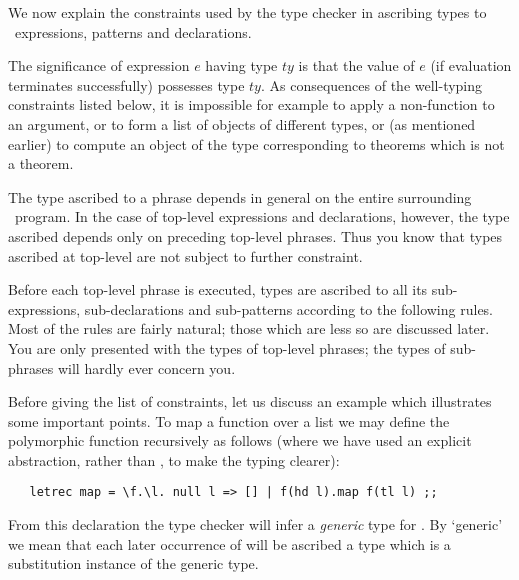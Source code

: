 \documentclass[11pt]{article}
\begin{document}

We now explain the constraints used by the type checker in ascribing types to
\ML\ expressions, patterns and declarations.

The significance of expression $e$ having type $ty$ is that the value of $e$ (if evaluation terminates successfully)
possesses type $ty$.   As consequences of the well-typing constraints listed below,
it is impossible for example to apply a non-function to an argument, or to form
a list of objects of different types, or (as mentioned earlier) to compute an
object of the type corresponding to theorems which is not a theorem.

The type  ascribed to a phrase depends in
general on the entire surrounding \ML\ program.  In the case of
top-level
expressions and declarations, however, the type ascribed depends only on
preceding top-level phrases.  Thus you know that types ascribed at top-level are
not subject to further constraint.

Before each top-level phrase is executed, types are ascribed to all its
sub-expressions, sub-declarations and sub-patterns according to the following
rules.  Most of the rules are fairly natural; those which are less so are
discussed later.  You are only presented with the types of top-level phrases;
the types of sub-phrases will hardly ever concern you.

Before giving the list of constraints, let us discuss an example which
illustrates some important points.  To map a function over a list we may define
the polymorphic function  recursively as follows (where we have used an
explicit abstraction, rather than , to make the typing
clearer):

\begin{verbatim}
   letrec map = \f.\l. null l => [] | f(hd l).map f(tl l) ;;
\end{verbatim}

\noindent From this declaration the type checker will infer a {\it
generic\/} type for .
By `generic' we mean that each later occurrence of  will be ascribed a
type which is a substitution instance of the generic type.
\end{document}
